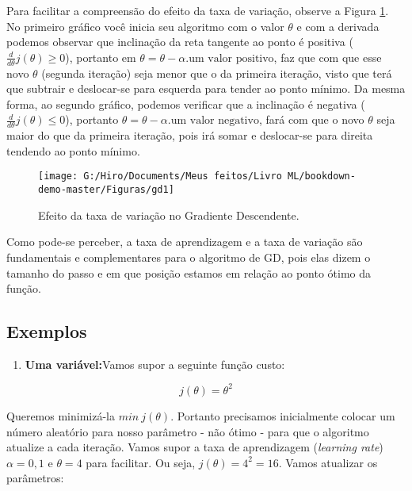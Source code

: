 \documentclass[
]{book}
\providecommand{\tightlist}{%
  \setlength{\itemsep}{0pt}\setlength{\parskip}{0pt}}
\begin{document}
Para facilitar a compreensão do efeito da taxa de variação, observe a Figura \ref{fig:gd1}. No primeiro gráfico você inicia seu algoritmo com o valor \(\theta\) e com a derivada podemos observar que inclinação da reta tangente ao ponto é positiva (\(\frac{d}{d\theta}j(\theta)\geq 0\)), portanto em \(\theta=\theta-\alpha.\mbox{um valor positivo}\), faz que com que esse novo \(\theta\) (segunda iteração) seja menor que o da primeira iteração, visto que terá que subtrair e deslocar-se para esquerda para tender ao ponto mínimo. Da mesma forma, ao segundo gráfico, podemos verificar que a inclinação é negativa (\(\frac{d}{d\theta}j(\theta)\leq 0\)), portanto \(\theta=\theta-\alpha.\mbox{um valor negativo}\), fará com que o novo \(\theta\) seja maior do que da primeira iteração, pois irá somar e deslocar-se para direita tendendo ao ponto mínimo.

\begin{figure}

{\centering \texttt{[image: G:/Hiro/Documents/Meus feitos/Livro ML/bookdown-demo-master/Figuras/gd1]} 

}

\caption{Efeito da taxa de variação no Gradiente Descendente.}\label{fig:gd1}
\end{figure}



Como pode-se perceber, a taxa de aprendizagem e a taxa de variação são fundamentais e complementares para o algoritmo de GD, pois elas dizem o tamanho do passo e em que posição estamos em relação ao ponto ótimo da função.

\hypertarget{exemplos}{%
\subsection{Exemplos}\label{exemplos}}

\begin{enumerate}
\def\labelenumi{\arabic{enumi}.}
\tightlist
\item
  \textbf{Uma variável:}Vamos supor a seguinte função custo:
\end{enumerate}

\[j(\theta)=\theta^2\]

Queremos minimizá-la \(min \ j(\theta)\). Portanto precisamos inicialmente colocar um número aleatório para nosso parâmetro - não ótimo - para que o algoritmo atualize a cada iteração. Vamos supor a taxa de aprendizagem (\emph{learning rate}) \(\alpha=0,1\) e \(\theta=4\) para facilitar. Ou seja, \(j(\theta)=4^2=16\). Vamos atualizar os parâmetros:
\end{document}
